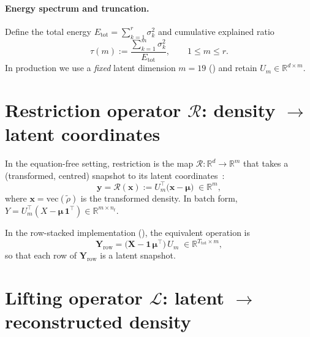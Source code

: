 \documentclass{report}
\theoremstyle{plain}
\theoremstyle{remark}
\numberwithin{equation}{section}              %
\begin{document}
\paragraph{Energy spectrum and truncation.}
\label{subsec:energy_truncation}
Define the total energy $E_{\mathrm{tot}}=\sum_{k=1}^r\sigma_k^2$ and
cumulative explained ratio
\[
  \tau(m) := \frac{\sum_{k=1}^{m}\sigma_k^2}{E_{\mathrm{tot}}},
  \qquad 1\le m\le r.
\]
In production we use a \emph{fixed} latent dimension $m=19$
() and retain $U_m\in\mathbb{R}^{d\times m}$.

%
\section{Restriction operator \texorpdfstring{$\mathcal{R}$}{R}:
  density \texorpdfstring{$\to$}{to} latent coordinates}
\label{sec:restriction}

In the equation-free setting, restriction is the map
$\mathcal{R}:\mathbb{R}^d\to\mathbb{R}^m$ that takes a (transformed,
centred) snapshot to its latent
coordinates~\cite{alvarez2025eqfree}:
\begin{equation}
  \mathbf{y} = \mathcal{R}(\mathbf{x})
  := U_m^\top\bigl(\mathbf{x}-\boldsymbol{\mu}\bigr)
  \;\in\mathbb{R}^m,
  \label{eq:restriction}
\end{equation}
where $\mathbf{x}=\mathrm{vec}(\tilde\rho)$ is the transformed density.
In batch form,
$Y = U_m^\top(X - \boldsymbol{\mu}\,\mathbf{1}^\top)
\in\mathbb{R}^{m\times n_t}$.

In the row-stacked implementation (), the equivalent
operation is
\[
  \mathbf{Y}_{\mathrm{row}} = \bigl(\mathbf{X}-\mathbf{1}\,\boldsymbol{\mu}^\top\bigr)\,U_m
  \;\in\mathbb{R}^{T_{\mathrm{tot}}\times m},
\]
so that each row of $\mathbf{Y}_{\mathrm{row}}$ is a latent snapshot.

%
\section{Lifting operator \texorpdfstring{$\mathcal{L}$}{L}:
  latent \texorpdfstring{$\to$}{to} reconstructed density}
\label{sec:lifting}
\end{document}
